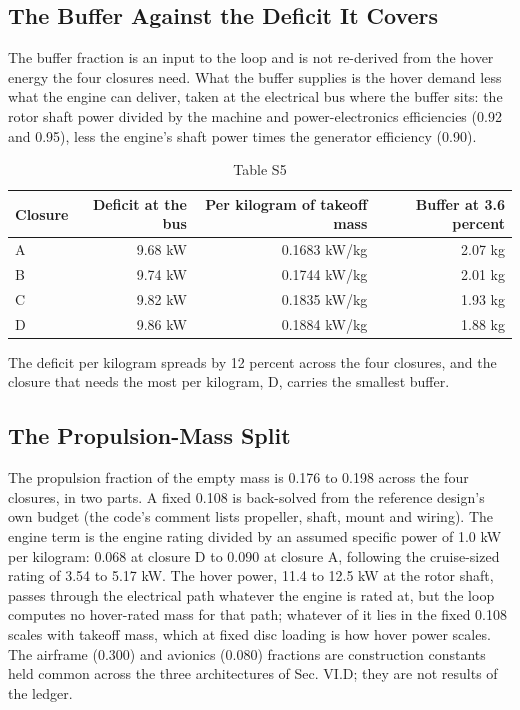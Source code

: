 \documentclass[journal]{new-aiaa}
\begin{document}
\subsection*{The Buffer Against the Deficit It Covers}

The buffer fraction is an input to the loop and is not re-derived from the hover energy the four closures need. What the buffer supplies is the hover demand less what the engine can deliver, taken at the electrical bus where the buffer sits: the rotor shaft power divided by the machine and power-electronics efficiencies (0.92 and 0.95), less the engine's shaft power times the generator efficiency (0.90).

\begin{table}[htbp]
\centering
\caption*{Table S5}
\small
\begin{tabularx}{\linewidth}{Xrrr}
\hline
Closure & Deficit at the bus & Per kilogram of takeoff mass & Buffer at 3.6 percent \\ \hline
A & 9.68 kW & 0.1683 kW/kg & 2.07 kg \\
B & 9.74 kW & 0.1744 kW/kg & 2.01 kg \\
C & 9.82 kW & 0.1835 kW/kg & 1.93 kg \\
D & 9.86 kW & 0.1884 kW/kg & 1.88 kg \\
\hline
\end{tabularx}
\end{table}

The deficit per kilogram spreads by 12 percent across the four closures, and the closure that needs the most per kilogram, D, carries the smallest buffer.

\subsection*{The Propulsion-Mass Split}

The propulsion fraction of the empty mass is 0.176 to 0.198 across the four closures, in two parts. A fixed 0.108 is back-solved from the reference design's own budget (the code's comment lists propeller, shaft, mount and wiring). The engine term is the engine rating divided by an assumed specific power of 1.0 kW per kilogram: 0.068 at closure D to 0.090 at closure A, following the cruise-sized rating of 3.54 to 5.17 kW. The hover power, 11.4 to 12.5 kW at the rotor shaft, passes through the electrical path whatever the engine is rated at, but the loop computes no hover-rated mass for that path; whatever of it lies in the fixed 0.108 scales with takeoff mass, which at fixed disc loading is how hover power scales. The airframe (0.300) and avionics (0.080) fractions are construction constants held common across the three architectures of Sec. VI.D; they are not results of the ledger.
\end{document}
